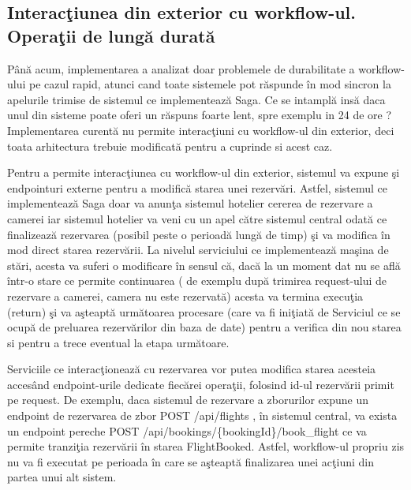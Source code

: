 \subsection{Interacţiunea din exterior cu workflow-ul. Operaţii de lungă durată}
\par Până acum, implementarea a analizat doar problemele de durabilitate a workflow-ului pe cazul rapid, atunci cand toate sistemele pot răspunde în mod sincron la apelurile trimise de sistemul ce implementează Saga. Ce se intamplă insă daca unul din sisteme poate oferi un răspuns foarte lent, spre exemplu in 24 de ore ? Implementarea curentă nu permite interacţiuni cu workflow-ul din exterior, deci toata arhitectura trebuie modificată pentru a cuprinde si acest caz. 
\par Pentru a permite interacţiunea cu workflow-ul din exterior, sistemul va expune şi endpointuri externe pentru a modifică starea unei rezervări. Astfel, sistemul ce implementează Saga doar va anunţa sistemul hotelier cererea de rezervare a camerei iar sistemul hotelier va veni cu un apel către sistemul central odată ce finalizează rezervarea (posibil peste o perioadă lungă de timp) şi va modifica în mod direct starea rezervării. La nivelul serviciului ce implementează maşina de stări, acesta va suferi o modificare în sensul că, dacă la un moment dat nu se află într-o stare ce permite continuarea ( de exemplu după trimirea request-ului de rezervare a camerei, camera nu este rezervată) acesta va termina execuţia (return) şi va aşteaptă următoarea procesare (care va fi iniţiată de Serviciul ce se ocupă de preluarea rezervărilor din baza de date) pentru a verifica din nou starea si pentru a trece eventual la etapa următoare. 
\par Serviciile ce interacţionează cu rezervarea vor putea modifica starea acesteia accesând endpoint-urile dedicate fiecărei operaţii, folosind id-ul rezervării primit pe request. De exemplu, daca sistemul de rezervare a zborurilor expune un endpoint de rezervarea de zbor POST \slash api\slash flights , în sistemul central, va exista un endpoint pereche POST \slash api\slash bookings\slash \{bookingId\}\slash book\_flight ce va permite tranziţia rezervării în starea FlightBooked. Astfel, workflow-ul propriu zis nu va fi executat pe perioada în care se aşteaptă finalizarea unei acţiuni din partea unui alt sistem. 
